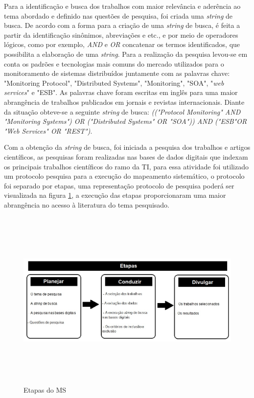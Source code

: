 Para a identificação e busca dos trabalhos com maior relevância e aderência ao tema abordado e definido nas questões de pesquisa, foi criada uma \textit{string} de busca. De acordo com \cite{keele2007guidelines} a forma para a criação de uma \textit{string} de busca, é feita a partir da identificação sinônimos, abreviações e etc., e por meio de operadores lógicos, como por exemplo, \textit{AND} e \textit{OR}  concatenar os termos identificados, que possibilita a elaboração de uma \textit{string}. Para a realização da pesquisa levou-se em conta os padrões e tecnologias mais comuns do mercado utilizados para o monitoramento de sistemas distribuídos juntamente com as palavras chave: "Monitoring Protocol", "Distributed Systems", "Monitoring", "\acrshort{SOA}", "\textit{web services}" e "\acrshort{ESB}". As palavras chave foram escritas em inglês para uma maior abrangência de trabalhos publicados em jornais e revistas internacionais. Diante da situação obteve-se a seguinte \textit{string} de busca: \textit{(("Protocol Monitoring" AND "Monitoring Systems") OR ("Distributed Systems" OR "SOA")) AND ("ESB"OR "Web Services" OR "REST")}.

Com a obtenção da \textit{string} de busca, foi iniciada a pesquisa dos trabalhos e artigos científicos, as pesquisas foram realizadas nas bases de dados digitais que indexam os principais trabalhos científicos do ramo da \acrlong{TI}, para essa atividade foi utilizado um protocolo pesquisa para a execução do mapeamento sistemático, o protocolo foi separado por etapas, uma representação protocolo de pesquisa poderá ser visualizada na figura \ref{fig:etapasRSL}, a execução das etapas proporcionaram uma maior abrangência no acesso à literatura do tema pesquisado\cite{kitchenham2007guidelines}.

\begin{figure}[!ht]
\centering
\includegraphics[width = 16cm, height=9cm]{img/etapas_RSL_final.jpg}
\caption{Etapas do \acrlong{MS}}
\label{fig:etapasRSL}
\end{figure}


